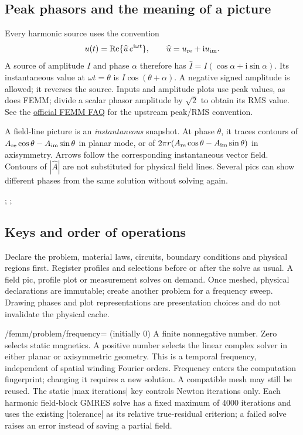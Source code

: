 \subsection{Peak phasors and the meaning of a picture}
Every harmonic source uses the convention
\[
 u(t)=\mathop{\rm Re}\{\widehat u\,e^{\mathrm{i}\omega t}\},\qquad
 \widehat u=u_{\rm re}+\mathrm{i}u_{\rm im}.
\]
A source of amplitude $I$ and phase $\alpha$ therefore has
$\widehat I=I(\cos\alpha+\mathrm{i}\sin\alpha)$. Its instantaneous value at
$\omega t=\theta$ is $I\cos(\theta+\alpha)$.
A negative signed amplitude is allowed; it reverses the source.
Inputs and amplitude plots use peak values, as does FEMM; divide a scalar
phasor amplitude by $\sqrt2$ to obtain its RMS value.
See the \href{https://www.femm.info/doku/doku.php?id=FAQ}{official FEMM FAQ}
for the upstream peak/RMS convention.

A field-line picture is an \emph{instantaneous} snapshot. At phase $\theta$,
it traces contours of $A_{\rm re}\cos\theta-A_{\rm im}\sin\theta$ in planar
mode, or of $2\pi r(A_{\rm re}\cos\theta-A_{\rm im}\sin\theta)$ in axisymmetry.
Arrows follow the corresponding instantaneous vector field. Contours of
$|\widehat A|$ are not substituted for physical field lines. Several pics can
show different phases from the same solution without solving again.
\begin{codeexample}
;
;
\end{codeexample}

\subsection{Keys and order of operations}
Declare the problem, material laws, circuits, boundary conditions and physical
regions first. Register profiles and selections before or after the solve as
usual. A field pic, profile plot or measurement solves on demand. Once meshed,
physical declarations are immutable; create another problem for a frequency
sweep. Drawing phases and plot representations are presentation choices and
do not invalidate the physical cache.

\begin{key}{/femm/problem/frequency= (initially 0)}
A finite nonnegative number. Zero selects static magnetics. A positive number
selects the linear complex solver in either planar or axisymmetric geometry.
This is a temporal frequency, independent of spatial winding Fourier orders.
Frequency enters the computation fingerprint; changing it requires a new
solution. A compatible mesh may still be reused. The static |max iterations|
key controls Newton iterations only. Each harmonic field-block GMRES solve has a fixed maximum of
4000 iterations and uses the existing |tolerance| as its relative true-residual
criterion; a failed solve raises an error instead of saving a partial field.
\end{key}

